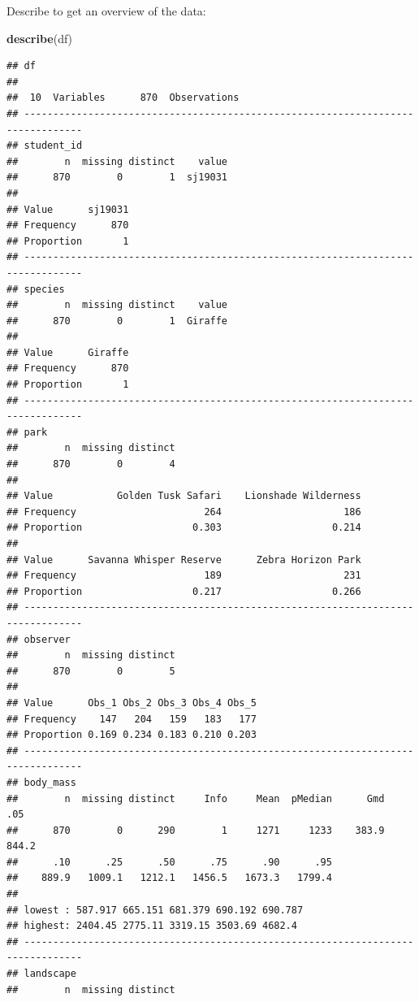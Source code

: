 \documentclass[
]{article}
\newenvironment{Shaded}{\begin{snugshade}}{\end{snugshade}}
\newcommand{\FunctionTok}[1]{\textcolor[rgb]{0.13,0.29,0.53}{\textbf{#1}}}
\newcommand{\NormalTok}[1]{#1}
\begin{document}
Describe to get an overview of the data:

\begin{Shaded}
\begin{Highlighting}[]
\FunctionTok{describe}\NormalTok{(df)}
\end{Highlighting}
\end{Shaded}

\begin{verbatim}
## df 
## 
##  10  Variables      870  Observations
## --------------------------------------------------------------------------------
## student_id 
##        n  missing distinct    value 
##      870        0        1  sj19031 
##                   
## Value      sj19031
## Frequency      870
## Proportion       1
## --------------------------------------------------------------------------------
## species 
##        n  missing distinct    value 
##      870        0        1  Giraffe 
##                   
## Value      Giraffe
## Frequency      870
## Proportion       1
## --------------------------------------------------------------------------------
## park 
##        n  missing distinct 
##      870        0        4 
##                                                           
## Value           Golden Tusk Safari    Lionshade Wilderness
## Frequency                      264                     186
## Proportion                   0.303                   0.214
##                                                           
## Value      Savanna Whisper Reserve      Zebra Horizon Park
## Frequency                      189                     231
## Proportion                   0.217                   0.266
## --------------------------------------------------------------------------------
## observer 
##        n  missing distinct 
##      870        0        5 
##                                         
## Value      Obs_1 Obs_2 Obs_3 Obs_4 Obs_5
## Frequency    147   204   159   183   177
## Proportion 0.169 0.234 0.183 0.210 0.203
## --------------------------------------------------------------------------------
## body_mass 
##        n  missing distinct     Info     Mean  pMedian      Gmd      .05 
##      870        0      290        1     1271     1233    383.9    844.2 
##      .10      .25      .50      .75      .90      .95 
##    889.9   1009.1   1212.1   1456.5   1673.3   1799.4 
## 
## lowest : 587.917 665.151 681.379 690.192 690.787
## highest: 2404.45 2775.11 3319.15 3503.69 4682.4 
## --------------------------------------------------------------------------------
## landscape 
##        n  missing distinct 

\end{verbatim}
\end{document}
